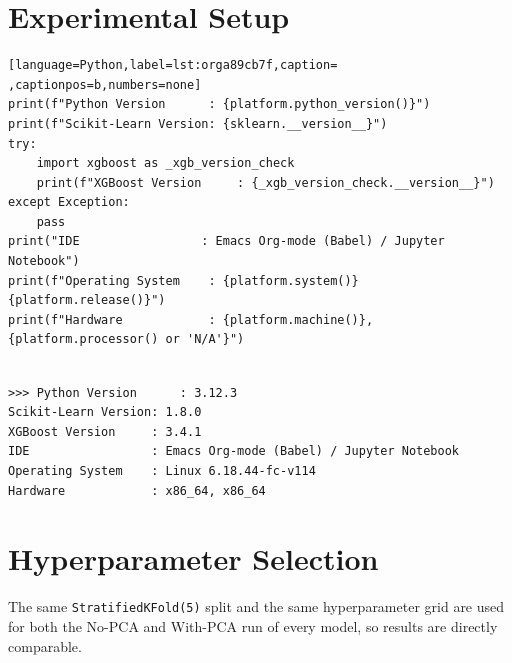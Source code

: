 \documentclass[12pt,a4paper]{article}
\begin{document}
\section{Experimental Setup}
\label{sec:org39a31be}

\begin{lstlisting}[language=Python,label=lst:orga89cb7f,caption= ,captionpos=b,numbers=none]
print(f"Python Version      : {platform.python_version()}")
print(f"Scikit-Learn Version: {sklearn.__version__}")
try:
    import xgboost as _xgb_version_check
    print(f"XGBoost Version     : {_xgb_version_check.__version__}")
except Exception:
    pass
print("IDE                 : Emacs Org-mode (Babel) / Jupyter Notebook")
print(f"Operating System    : {platform.system()} {platform.release()}")
print(f"Hardware            : {platform.machine()}, {platform.processor() or 'N/A'}")
\end{lstlisting}

\begin{verbatim}

>>> Python Version      : 3.12.3
Scikit-Learn Version: 1.8.0
XGBoost Version     : 3.4.1
IDE                 : Emacs Org-mode (Babel) / Jupyter Notebook
Operating System    : Linux 6.18.44-fc-v114
Hardware            : x86_64, x86_64
\end{verbatim}


\section{Hyperparameter Selection}
\label{sec:org609c9bd}

The same \texttt{StratifiedKFold(5)} split and the same hyperparameter grid are used for both the
No-PCA and With-PCA run of every model, so results are directly comparable.
\end{document}
